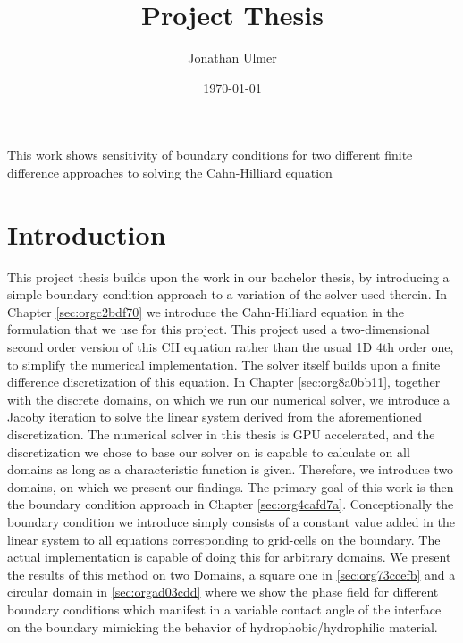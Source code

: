 \documentclass{mimosis}
\author{Jonathan Ulmer}
\date{\today}
\title{Project Thesis}
\newenvironment{abstract} {}{}
\begin{document}
\maketitle
\setcounter{tocdepth}{1}
\tableofcontents

\begin{abstract}
This work shows sensitivity of boundary conditions for two different finite difference approaches to solving the Cahn-Hilliard equation
\end{abstract}
\chapter{Introduction}
\label{sec:org1eecc31}
This project thesis builds upon the work in our bachelor thesis, by introducing a simple boundary condition approach to a variation of the solver used therein. In Chapter \ref{sec:orgc2bdf70} we introduce the Cahn-Hilliard equation in the formulation that we use for this project. This project used a two-dimensional second order version of this CH equation rather than the usual 1D 4th order one, to simplify the numerical implementation. The solver itself builds upon a finite difference discretization of this equation. In Chapter \ref{sec:org8a0bb11}, together with the discrete domains, on which we run our numerical solver, we introduce a Jacoby iteration to solve the linear system derived from the aforementioned discretization.  The numerical solver in this thesis is GPU accelerated, and the discretization we chose to base our solver on is capable to calculate on all domains as long as a characteristic function is given. Therefore, we introduce two domains, on which we present our findings. The primary goal of this work is then the boundary condition approach in Chapter \ref{sec:org4cafd7a}. Conceptionally the boundary condition we introduce simply consists of a constant value added in the linear system to all equations corresponding to grid-cells on the boundary. The actual implementation is capable of doing this for arbitrary domains. We present the results of this method on two Domains, a square one in \ref{sec:org73ccefb} and a circular domain in \ref{sec:orgad03cdd} where we show the phase field for different boundary conditions which manifest in a variable contact angle of the interface on the boundary mimicking the behavior of hydrophobic/hydrophilic material.
\end{document}
